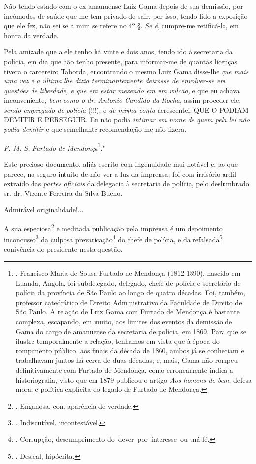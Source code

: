 Não tendo estado com o ex-amanuense Luiz Gama depois de sua demissão,
por incômodos de saúde que me tem privado de sair, por isso, tendo lido
a exposição que ele fez, não sei se a mim se refere no 4º §. \emph{Se
é}, cumpre-me retificá-lo, em honra da verdade.

Pela amizade que a ele tenho há vinte e dois anos, tendo ido à
secretaria da polícia, em dia que não tenho presente, para informar-me
de quantas licenças tivera o carcereiro Taborda, encontrando o mesmo
Luiz Gama disse-lhe \emph{que mais uma vez e a última lhe dizia
terminantemente deixasse de envolver-se em questões de liberdade, e que
era estar mexendo em um vulcão,} e que eu achava inconveniente\emph{,
bem como o dr. Antonio Candido da Rocha}, assim proceder ele,
\emph{sendo empregado de polícia} (!!!); e \emph{de minha conta}
acrescentei: QUE O PODIAM DEMITIR E PERSEGUIR. Eu não podia
\emph{intimar em nome de quem pela lei não podia demitir} e que
semelhante recomendação me não fizera.

\emph{F. M. S. Furtado de Mendonça}\footnote{. Francisco Maria de Sousa
  Furtado de Mendonça (1812-1890), nascido em Luanda, Angola, foi
  subdelegado, delegado, chefe de polícia e secretário de polícia da
  província de São Paulo ao longo de quatro décadas. Foi, também,
  professor catedrático de Direito Administrativo da Faculdade de
  Direito de São Paulo. A relação de Luiz Gama com Furtado de Mendonça é
  bastante complexa, escapando, em muito, aos limites dos eventos da
  demissão de Gama do cargo de amanuense da secretaria de polícia, em
  1869. Para que se ilustre temporalmente a relação, tenhamos em vista
  que à época do rompimento público, aos finais da década de 1860, ambos
  já se conheciam e trabalhavam juntos há cerca de duas décadas; e,
  mais, Gama não rompeu definitivamente com Furtado de Mendonça, como
  erroneamente indica a historiografia, visto que em 1879 publicou o
  artigo \emph{Aos homens de bem}, defesa moral e política explícita do
  legado de Furtado de Mendonça.}."

Este precioso documento, aliás escrito com ingenuidade mui notável e, ao
que parece, no seguro intuito de não ver a luz da imprensa, foi com
irrisório ardil extraído das \emph{partes oficiais} da delegacia à
secretaria de polícia, pelo deslumbrado sr. dr. Vicente Ferreira da
Silva Bueno.

Admirável originalidade!...

A sua especiosa\footnote{. Enganosa, com aparência de verdade.} e
meditada publicação pela imprensa é um depoimento inconcusso\footnote{.
  Indiscutível, incontestável.} da culposa prevaricação\footnote{.
  Corrupção, descumprimento do~dever~por~interesse~ou~má-fé.} do chefe
de polícia, e da refalsada\footnote{. Desleal, hipócrita.} conivência do
presidente nesta questão.


